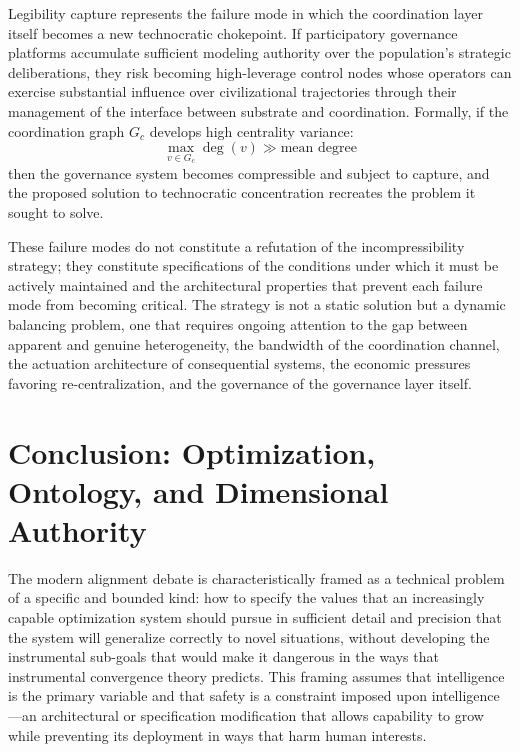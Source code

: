 \documentclass[12pt]{article}
\begin{document}
Legibility capture represents the failure mode in which the coordination layer itself becomes a new technocratic chokepoint. If participatory governance platforms accumulate sufficient modeling authority over the population's strategic deliberations, they risk becoming high-leverage control nodes whose operators can exercise substantial influence over civilizational trajectories through their management of the interface between substrate and coordination. Formally, if the coordination graph $G_c$ develops high centrality variance:
\[
\max_{v \in G_c} \deg(v) \gg \text{mean degree}
\]
then the governance system becomes compressible and subject to capture, and the proposed solution to technocratic concentration recreates the problem it sought to solve.

These failure modes do not constitute a refutation of the incompressibility strategy; they constitute specifications of the conditions under which it must be actively maintained and the architectural properties that prevent each failure mode from becoming critical. The strategy is not a static solution but a dynamic balancing problem, one that requires ongoing attention to the gap between apparent and genuine heterogeneity, the bandwidth of the coordination channel, the actuation architecture of consequential systems, the economic pressures favoring re-centralization, and the governance of the governance layer itself.

\section{Conclusion: Optimization, Ontology, and Dimensional Authority}

The modern alignment debate is characteristically framed as a technical problem of a specific and bounded kind: how to specify the values that an increasingly capable optimization system should pursue in sufficient detail and precision that the system will generalize correctly to novel situations, without developing the instrumental sub-goals that would make it dangerous in the ways that instrumental convergence theory predicts. This framing assumes that intelligence is the primary variable and that safety is a constraint imposed upon intelligence---an architectural or specification modification that allows capability to grow while preventing its deployment in ways that harm human interests.
\end{document}
